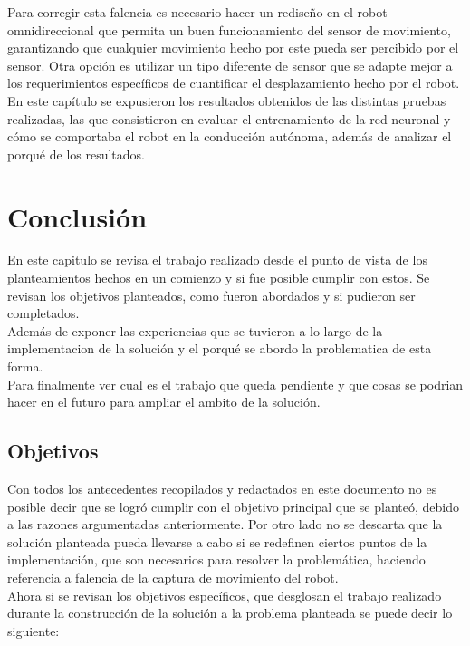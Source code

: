 \documentclass{iccmemoria}
\begin{document}
Para corregir esta falencia es necesario hacer un rediseño en el robot omnidireccional que permita un buen funcionamiento del sensor de movimiento, garantizando que cualquier movimiento hecho por este pueda ser percibido por el sensor. Otra opción es utilizar un tipo diferente de sensor que se adapte mejor a los requerimientos específicos de cuantificar el desplazamiento hecho por el robot.\\

En este capítulo se expusieron los resultados obtenidos de las distintas pruebas realizadas, las que consistieron en evaluar el entrenamiento de la red neuronal y cómo se comportaba el robot en la conducción autónoma, además de analizar el porqué de los resultados.\\

\chapter{Conclusión}

En este capitulo se revisa el trabajo realizado desde el punto de vista de los planteamientos hechos en un comienzo y si fue posible cumplir con estos. Se revisan los objetivos planteados, como fueron abordados y si pudieron ser completados.\\

Además de exponer las experiencias que se tuvieron a lo largo de la implementacion de la solución y el porqué se abordo la problematica de esta forma.\\

Para finalmente ver cual es el trabajo que queda pendiente y que cosas se podrian hacer en el futuro para ampliar el ambito de la solución.\\

\section{Objetivos}

Con todos los antecedentes recopilados y redactados en este documento no es posible decir que se logró cumplir con el objetivo principal que se planteó, debido a las razones argumentadas anteriormente. Por otro lado no se descarta que la solución planteada pueda llevarse a cabo si se redefinen ciertos puntos de la implementación, que son necesarios para resolver la problemática, haciendo referencia a falencia de la captura de movimiento del robot.\\

Ahora si se revisan los objetivos específicos, que desglosan el trabajo realizado durante la construcción de la solución a la problema planteada se puede decir lo siguiente:
\end{document}
